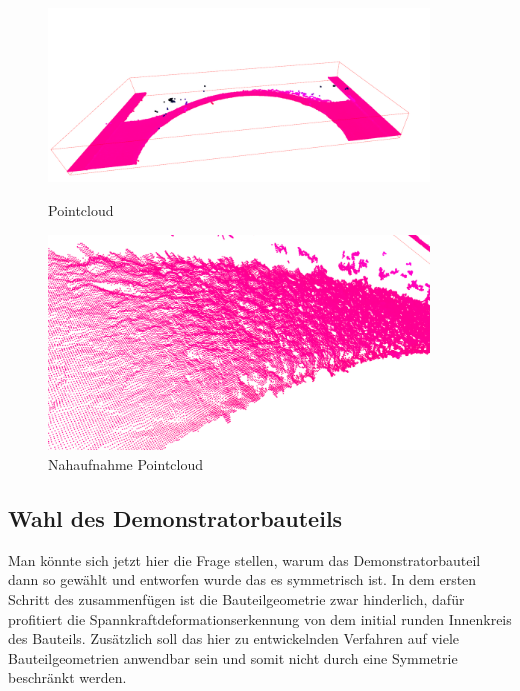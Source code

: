 \documentclass[../main.tex]{subfiles}
\begin{document}
\begin{figure}[h!]
    \centering
    \begin{minipage}{0.45\textwidth}
        \centering
        \includegraphics[width=0.9\textwidth]{images/pointcloud_big.PNG} %
        \caption{Pointcloud}
        \label{fig:pointcloud_big}
    \end{minipage}\hfill
    \begin{minipage}{0.45\textwidth}
        \centering
        \includegraphics[width=0.9\textwidth]{images/pointcloud_small.PNG} %
        \caption{Nahaufnahme Pointcloud}
        \label{fig:pointcloud_small}
    \end{minipage}
\end{figure}

\subsection*{Wahl des Demonstratorbauteils}

Man könnte sich jetzt hier die Frage stellen, warum das Demonstratorbauteil dann so gewählt 
und entworfen wurde das es symmetrisch ist. In dem ersten Schritt des zusammenfügen ist 
die Bauteilgeometrie zwar hinderlich, dafür profitiert die 
Spannkraftdeformationserkennung von dem initial runden Innenkreis des Bauteils.
Zusätzlich soll das hier zu entwickelnden Verfahren auf viele Bauteilgeometrien 
anwendbar sein und somit nicht durch eine Symmetrie beschränkt werden.
\end{document}
